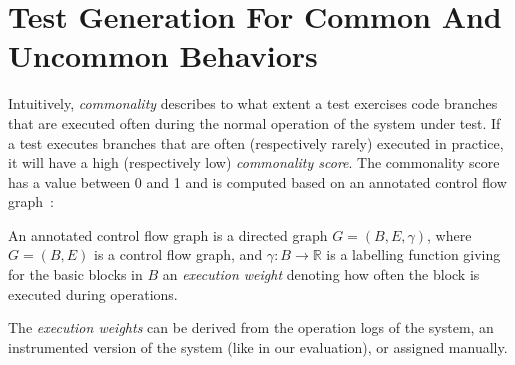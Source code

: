 
\section{Test Generation For Common And Uncommon Behaviors}
\label{sec:cub:approach}


Intuitively, \emph{commonality} describes to what extent a test exercises code branches that are executed often during the normal operation of the system under test. If a test executes branches that are often (respectively rarely) executed in practice, it will have a high (respectively low) \emph{commonality score}. The commonality score has a value between 0 and 1 and is computed based on an annotated control flow graph~\cite{Allen:1970:CFA:800028.808479}:
\begin{definition}
    An annotated control flow graph is a directed graph $G = (B, E, \gamma)$, where $G=(B,E)$ is a control flow graph, and $\gamma: B \rightarrow \mathbb{R}$ is a labelling function giving for the basic blocks in $B$ an \emph{execution weight} denoting how often the block is executed during operations.
\end{definition}
%
The \emph{execution weights} can be derived from the operation logs of the system, an instrumented version of the system (like in our evaluation), or assigned manually. 

